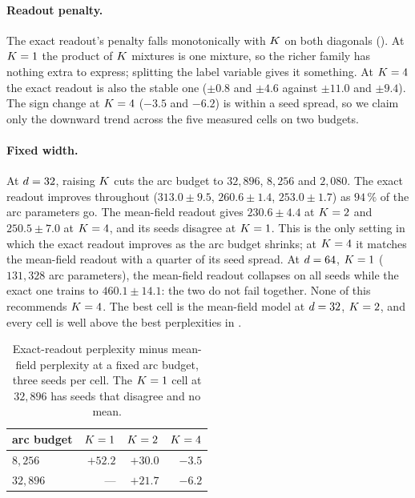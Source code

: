 \paragraph{Readout penalty.}
The exact readout's penalty falls monotonically with $K$ on both diagonals
(). At $K=1$ the product of $K$ mixtures is one mixture, so the
richer family has nothing extra to express; splitting the label variable gives it something. At
$K=4$ the exact readout is also the stable one ($\pm0.8$ and $\pm4.6$ against $\pm11.0$ and
$\pm9.4$). The sign change at $K=4$ ($-3.5$ and $-6.2$) is within a seed spread, so we claim
only the downward trend across the five measured cells on two budgets.

\paragraph{Fixed width.}
At $d=32$, raising $K$ cuts the arc budget to $32{,}896$, $8{,}256$ and $2{,}080$. The
exact readout improves throughout ($313.0\pm9.5$, $260.6\pm1.4$, $253.0\pm1.7$) as $94\,\%$ of the
arc parameters go. The mean-field readout gives $230.6\pm4.4$ at $K=2$ and $250.5\pm7.0$ at
$K=4$, and its seeds disagree at $K=1$. This is the only setting in which the exact
readout improves as the arc budget shrinks; at $K=4$ it matches the mean-field readout with
a quarter of its seed spread. At $d=64$, $K=1$ ($131{,}328$ arc parameters), the mean-field readout
collapses on all seeds while the exact one trains to $460.1\pm14.1$: the two do not fail together.
None of this recommends $K=4$. The best cell is the mean-field model at $d=32$,
$K=2$, and every cell is well above the best perplexities in .

\begin{table}[ht]
\centering\footnotesize
\begin{tabular}{@{}l@{\ \ }r@{\ \ }r@{\ \ }r@{}}
\toprule
arc budget & $K=1$ & $K=2$ & $K=4$ \\
\midrule
$8{,}256$   & $+52.2$ & $+30.0$ & $-3.5$ \\
$32{,}896$  & ---     & $+21.7$ & $-6.2$ \\
\bottomrule
\end{tabular}
\caption{Exact-readout perplexity minus mean-field perplexity at a fixed arc budget, three seeds
per cell. The $K=1$ cell at $32{,}896$ has seeds that disagree and no mean.}
\label{tab:penalty}
\end{table}

